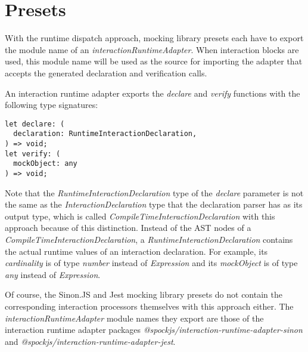 \section{Presets}
With the runtime dispatch approach,
mocking library presets
each have to export the module name of an
\textit{interactionRuntimeAdapter}.
When interaction blocks are used,
this module name will be used as the source
for importing the adapter that accepts
the generated declaration and verification calls.

An interaction runtime adapter exports
the \textit{declare} and \textit{verify}
functions with the following type signatures:
\begin{verbatim}
let declare: (
  declaration: RuntimeInteractionDeclaration,
) => void;
let verify: (
  mockObject: any
) => void;
\end{verbatim}
Note that the \textit{RuntimeInteractionDeclaration} type
of the \textit{declare} parameter is not the same
as the \textit{InteractionDeclaration} type
that the declaration parser has as its output type,
which is called \textit{CompileTimeInteractionDeclaration}
with this approach because of this distinction.
Instead of the AST nodes of a
\textit{CompileTimeInteractionDeclaration}, a
\textit{RuntimeInteractionDeclaration} contains
the actual runtime values of an interaction declaration.
For example,
its \textit{cardinality} is of type \textit{number} instead of \textit{Expression}
and its \textit{mockObject} is of type \textit{any} instead of \textit{Expression}.

Of course, the Sinon.JS and Jest mocking library presets
do not contain the corresponding interaction processors themselves
with this approach either.
The \textit{interactionRuntimeAdapter} module names they export
are those of the interaction runtime adapter packages
\textit{@spockjs/interaction-runtime-adapter-sinon} and
\textit{@spockjs/interaction-runtime-adapter-jest}.
